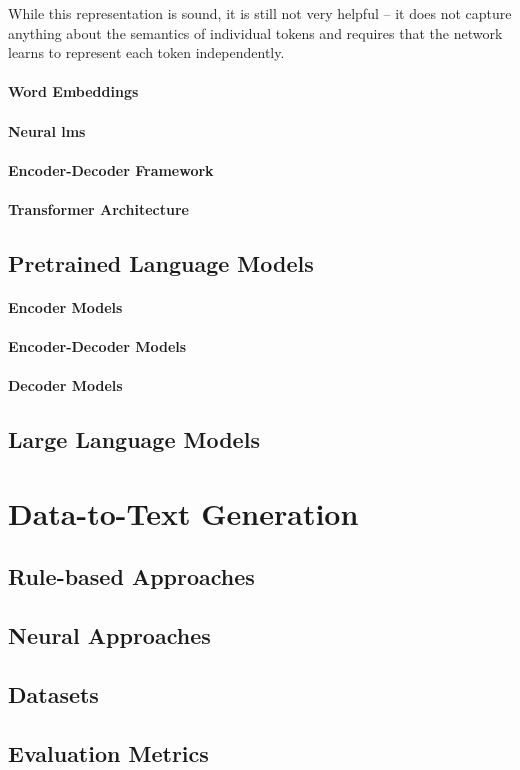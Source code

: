 While this representation is sound, it is still not very helpful -- it does not capture anything about the semantics of individual tokens and requires that the network learns to represent each token independently.

\paragraph{Word Embeddings}

\paragraph{Neural \acp{lm}}

\paragraph{Encoder-Decoder Framework}

\paragraph{Transformer Architecture}
\subsection{Pretrained Language Models}
\label{sec:plms}

\paragraph{Encoder Models}

\paragraph{Encoder-Decoder Models}

\paragraph{Decoder Models}

\subsection{Large Language Models}
\label{sec:llms}
\section{Data-to-Text Generation}
\label{sec:d2t}
\subsection{Rule-based Approaches}
\label{sec:rule-d2t}
\subsection{Neural Approaches}
\label{sec:neural-d2t}
\subsection{Datasets}
\label{sec:datasets}
\subsection{Evaluation Metrics}
\label{sec:evaluation}